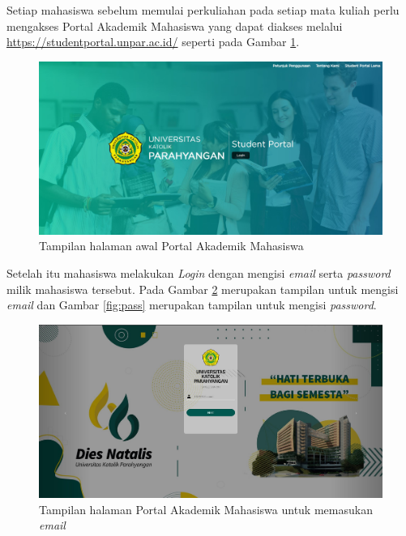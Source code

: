 Setiap mahasiswa sebelum memulai perkuliahan pada setiap mata kuliah perlu mengakses Portal Akademik Mahasiswa yang dapat diakses melalui \url{https://studentportal.unpar.ac.id/} seperti pada Gambar \ref{fig:studpor_home_2019}. 
\begin{figure}[H]
	\centering
	\includegraphics[scale=0.225]{Gambar/halaman2019.jpg}
	\caption{Tampilan halaman awal Portal Akademik Mahasiswa} 
	\label{fig:studpor_home_2019}
\end{figure}

Setelah itu mahasiswa melakukan \textit{Login} dengan mengisi \textit{email} serta \textit{password} milik mahasiswa tersebut. Pada Gambar \ref{fig:login} merupakan tampilan untuk mengisi \textit{email} dan Gambar \ref{fig:pass} merupakan tampilan untuk mengisi \textit{password}.
\begin{figure}[H]
	\centering
	\includegraphics[scale=0.225]{Gambar/login.jpg}
	\caption{Tampilan halaman Portal Akademik Mahasiswa untuk memasukan \textit{email}} 
	\label{fig:login}
\end{figure}

